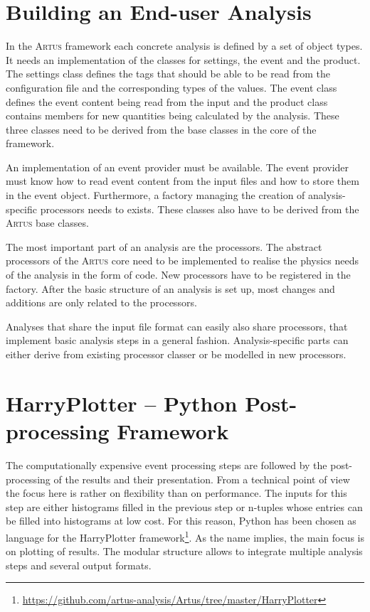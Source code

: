 \documentclass[3p]{elsarticle}
\newcommand{\software}[1]{\textsc{#1}\xspace}
\newcommand{\artus}{\software{Artus}}
\begin{document}
\section{Building an End-user Analysis \label{section_artus_analysis}}
In the \artus framework each concrete analysis is defined by a set of object types.
It needs an implementation of the classes for settings, the event and the product.
The settings class defines the tags that should be able to be read from the configuration file and the corresponding types of the values.
The event class defines the event content being read from the input and the product class contains members for new quantities being calculated by the analysis.
These three classes need to be derived from the base classes in the core of the framework.

An implementation of an event provider must be available.
The event provider must know how to read event content from the input files and how to store them in the event object.
Furthermore, a factory managing the creation of analysis-specific processors needs to exists.
These classes also have to be derived from the \artus base classes.

The most important part of an analysis are the processors.
The abstract processors of the \artus core need to be implemented to realise the physics needs of the analysis in the form of code.
New processors have to be registered in the factory.
After the basic structure of an analysis is set up, most changes and additions are only related to the processors.

Analyses that share the input file format can easily also share processors, that implement basic analysis steps in a general fashion.
Analysis-specific parts can either derive from existing processor classer or be modelled in new processors.


\section{HarryPlotter -- Python Post-processing Framework \label{section_artus_harryplotter}}

The computationally expensive event processing steps are followed by the post-processing of the results and their presentation.
From a technical point of view the focus here is rather on flexibility than on performance.
The inputs for this step are either histograms filled in the previous step or n-tuples whose entries can be filled into histograms at low cost.
For this reason, Python has been chosen as language for the HarryPlotter framework\footnote{\url{https://github.com/artus-analysis/Artus/tree/master/HarryPlotter}}.
As the name implies, the main focus is on plotting of results.
The modular structure allows to integrate multiple analysis steps and several output formats.
\end{document}
